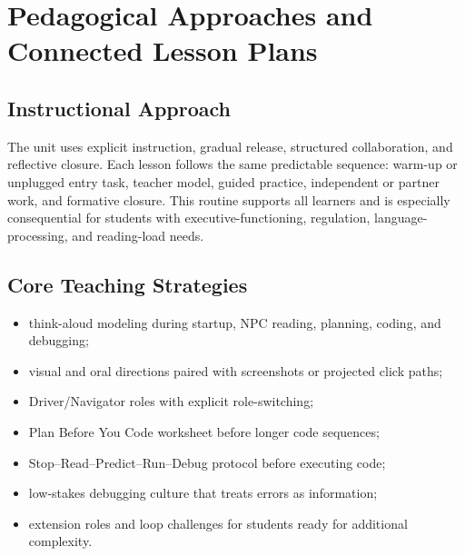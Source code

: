 \documentclass[12pt]{article}
\begin{document}
\section{Pedagogical Approaches and Connected Lesson Plans}
\subsection{Instructional Approach}
The unit uses explicit instruction, gradual release, structured collaboration, and reflective closure. Each lesson follows the same predictable sequence: warm-up or unplugged entry task, teacher model, guided practice, independent or partner work, and formative closure. This routine supports all learners and is especially consequential for students with executive-functioning, regulation, language-processing, and reading-load needs.

\subsection{Core Teaching Strategies}
\begin{itemize}
\item think-aloud modeling during startup, NPC reading, planning, coding, and debugging;
\item visual and oral directions paired with screenshots or projected click paths;
\item Driver/Navigator roles with explicit role-switching;
\item Plan Before You Code worksheet before longer code sequences;
\item Stop--Read--Predict--Run--Debug protocol before executing code;
\item low-stakes debugging culture that treats errors as information;
\item extension roles and loop challenges for students ready for additional complexity.
\end{itemize}
\end{document}
